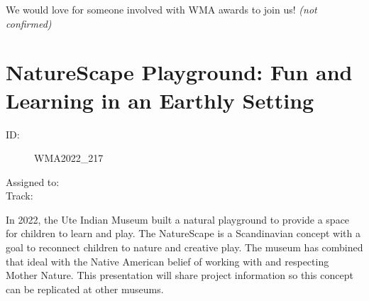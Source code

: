 \documentclass{report}
\begin{document}
                

                We would love for someone involved with WMA awards to join us!
                \emph{ (not confirmed) }
              

              

              
        
          \newpage
          \section{ NatureScape Playground: Fun and Learning in an Earthly Setting }
            \begin{description}
              \item [ID:]
              WMA2022\_217

              \item [Assigned to:]
                \item [Track:]
              \end{description}

              In 2022, the Ute Indian Museum built a natural playground to provide a space for children to learn and play. The NatureScape is a Scandinavian concept with a goal to reconnect children to nature and creative play. The museum has combined that ideal with the Native American belief of working with and respecting Mother Nature. This presentation will share project information so this concept can be replicated at other museums.
\end{document}
